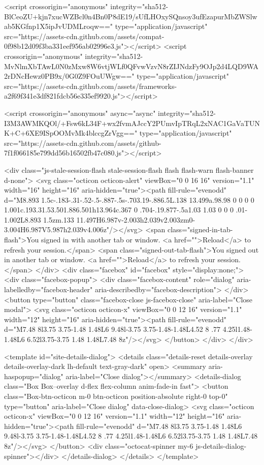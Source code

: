     <script crossorigin="anonymous" integrity="sha512-BlCeoZU+kjn7xucWZBcl0n4Bn0P8dE19/sUfLHOxySQnsoy3ufEzapurMbZWSlwab5KGfnp1X5ipJvUDMLroqw==" type="application/javascript" src="https://assets-cdn.github.com/assets/compat-0f98b12d09f3ba331eef956ab02996e3.js"></script>
    <script crossorigin="anonymous" integrity="sha512-MvNlmXbTAwL0N0zMxw8W6vtjWLf0QFvwVzvN8rZIJNdzFy9OJp2d4LQD9WA2rDNcHewz0PB9x/0G0Z9FOuUWgw==" type="application/javascript" src="https://assets-cdn.github.com/assets/frameworks-a2f69f341e3df821fdcb56e335ef9920.js"></script>
    
    <script crossorigin="anonymous" async="async" integrity="sha512-I3M3AWMKQOl/+Fsw6kL34F+wx2fvmAJccY2PUmvIpTRqL2xNAC1GaVaTUNK+C+6XE9ISpOOMvMk4blccgZrVgg==" type="application/javascript" src="https://assets-cdn.github.com/assets/github-7f1f066185e799dd56b16502fb47c080.js"></script>
    
    
    
  <div class="js-stale-session-flash stale-session-flash flash flash-warn flash-banner d-none">
    <svg class="octicon octicon-alert" viewBox="0 0 16 16" version="1.1" width="16" height="16" aria-hidden="true"><path fill-rule="evenodd" d="M8.893 1.5c-.183-.31-.52-.5-.887-.5s-.703.19-.886.5L.138 13.499a.98.98 0 0 0 0 1.001c.193.31.53.501.886.501h13.964c.367 0 .704-.19.877-.5a1.03 1.03 0 0 0 .01-1.002L8.893 1.5zm.133 11.497H6.987v-2.003h2.039v2.003zm0-3.004H6.987V5.987h2.039v4.006z"/></svg>
    <span class="signed-in-tab-flash">You signed in with another tab or window. <a href="">Reload</a> to refresh your session.</span>
    <span class="signed-out-tab-flash">You signed out in another tab or window. <a href="">Reload</a> to refresh your session.</span>
  </div>
  <div class="facebox" id="facebox" style="display:none;">
  <div class="facebox-popup">
    <div class="facebox-content" role="dialog" aria-labelledby="facebox-header" aria-describedby="facebox-description">
    </div>
    <button type="button" class="facebox-close js-facebox-close" aria-label="Close modal">
      <svg class="octicon octicon-x" viewBox="0 0 12 16" version="1.1" width="12" height="16" aria-hidden="true"><path fill-rule="evenodd" d="M7.48 8l3.75 3.75-1.48 1.48L6 9.48l-3.75 3.75-1.48-1.48L4.52 8 .77 4.25l1.48-1.48L6 6.52l3.75-3.75 1.48 1.48L7.48 8z"/></svg>
    </button>
  </div>
</div>

  <template id="site-details-dialog">
  <details class="details-reset details-overlay details-overlay-dark lh-default text-gray-dark" open>
    <summary aria-haspopup="dialog" aria-label="Close dialog"></summary>
    <details-dialog class="Box Box--overlay d-flex flex-column anim-fade-in fast">
      <button class="Box-btn-octicon m-0 btn-octicon position-absolute right-0 top-0" type="button" aria-label="Close dialog" data-close-dialog>
        <svg class="octicon octicon-x" viewBox="0 0 12 16" version="1.1" width="12" height="16" aria-hidden="true"><path fill-rule="evenodd" d="M7.48 8l3.75 3.75-1.48 1.48L6 9.48l-3.75 3.75-1.48-1.48L4.52 8 .77 4.25l1.48-1.48L6 6.52l3.75-3.75 1.48 1.48L7.48 8z"/></svg>
      </button>
      <div class="octocat-spinner my-6 js-details-dialog-spinner"></div>
    </details-dialog>
  </details>
</template>

